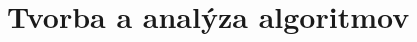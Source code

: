 \chapter[Tvorba a analýza algoritmov]{Tvorba a analýza algoritmov}
\label{tvorba_a_analyza_algoritmov} %


